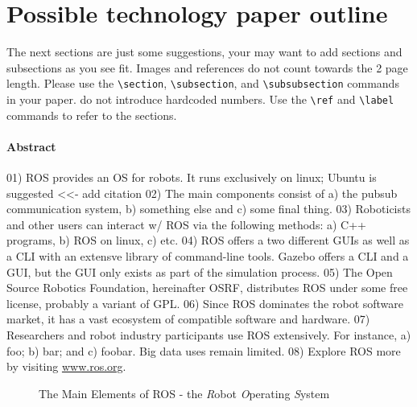 \documentclass[9pt,twocolumn,twoside]{styles/osajnl}
\begin{document}
\section{Possible technology paper outline}

The next sections are just some suggestions, your may want to add
sections and subsections as you see fit. Images and references do not
count towards the 2 page length. Please use the \verb|\section|,
\verb|\subsection|, and \verb|\subsubsection| commands in your
paper. do not introduce hardcoded numbers. Use the \verb|\ref| and
\verb|\label| commands to refer
 to the sections.


\paragraph{Abstract}

01) ROS provides an OS for robots.  It runs exclusively on linux; Ubuntu is suggested <<- add citation
02) The main components consist of a) the pubsub communication system, b) something else and c) some final thing.
03) Roboticists and other users can interact w/ ROS via the following methods: a) C++ programs, b) ROS on linux, c) etc.
04) ROS offers a two different GUIs as well as a CLI with an extensve library of command-line tools.  Gazebo offers a CLI and a GUI, but the GUI only exists as part of the simulation process.
05) The Open Source Robotics Foundation, hereinafter OSRF, distributes ROS under some free license, probably a variant of GPL.
06) Since ROS dominates the robot software market, it has a vast ecosystem of compatible software and hardware.
07) Researchers and robot industry participants use ROS extensively.  For instance, a) foo; b) bar; and c) foobar.  Big data uses remain limited.
08) Explore ROS more by visiting \url{www.ros.org}.

\begin{figure}[htbp]
\centering
{}
\caption{The Main Elements of ROS - the \textit{R}obot \textit{O}perating \textit{S}ystem \cite{www-ros-about}}
\label{fig:rosOverview}
\end{figure}
\end{document}
